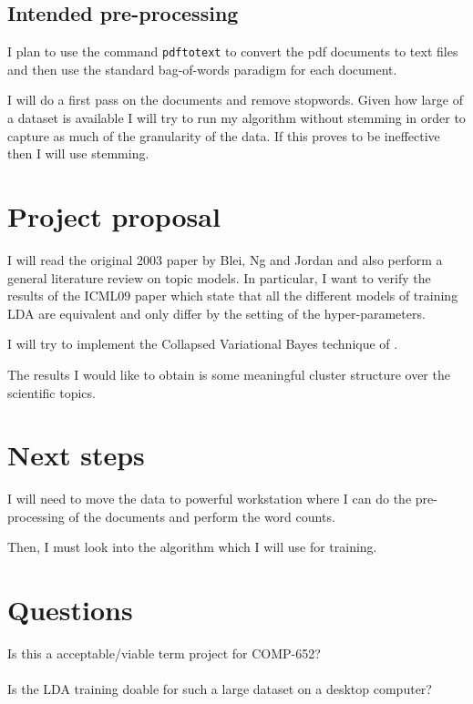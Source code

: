 \documentclass[11pt]{article}
\begin{document}
	
	\subsection{Intended pre-processing}
	
		I plan to use the command \texttt{pdftotext} to convert the pdf documents to text files and
		then use the standard bag-of-words paradigm for each document.
		
		I will do a first pass on the documents and remove stopwords.		
		Given how large of a dataset is available I will try to run my algorithm without stemming in order
		to capture as much of the granularity of the data.
		If this proves to be ineffective then I will use stemming.
		  

	
\section{Project proposal}

	I will read the original 2003 paper by Blei, Ng and Jordan \cite{Blei2003} and also perform a general literature
	review on topic models.
	In particular, I want to verify the results of the ICML09 paper \cite{Teh2009} which state that all the different 
	models of training
	LDA are equivalent and only differ by the setting of the hyper-parameters.
	
	I will try to implement the Collapsed Variational Bayes technique of \cite{Teh2007}.
	
	The results I would like to obtain is some meaningful cluster structure over the scientific topics.
	
	
\section{Next steps}
	
	I will need to move the data to powerful workstation where I can do the pre-processing of the
	documents and perform the word counts.
	
	Then, I must look into the algorithm which I will use for training.
	
	
\section{Questions}

	Is this a acceptable/viable term project for COMP-652?
	\ \\
	\ \\
	\noindent Is the LDA training doable for such a large dataset on a desktop computer?
	
	
	




\end{document}
